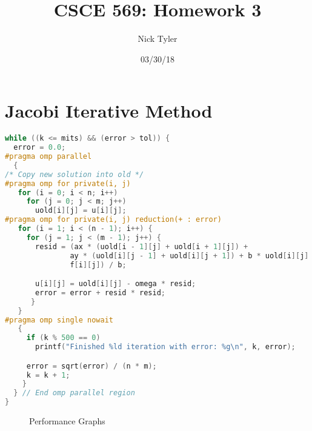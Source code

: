 \documentclass[a4paper]{article}
\title{CSCE 569: Homework 3}
\author{Nick Tyler}
\date{03/30/18}
\begin{document}
\maketitle

\section*{Jacobi Iterative Method}


\begin{lstlisting}[language=C++]
while ((k <= mits) && (error > tol)) {
  error = 0.0;
#pragma omp parallel
  {
/* Copy new solution into old */
#pragma omp for private(i, j)
   for (i = 0; i < n; i++)
     for (j = 0; j < m; j++)
       uold[i][j] = u[i][j];
#pragma omp for private(i, j) reduction(+ : error)
   for (i = 1; i < (n - 1); i++) {
     for (j = 1; j < (m - 1); j++) {
       resid = (ax * (uold[i - 1][j] + uold[i + 1][j]) +
               ay * (uold[i][j - 1] + uold[i][j + 1]) + b * uold[i][j] -
               f[i][j]) / b;

       u[i][j] = uold[i][j] - omega * resid;
       error = error + resid * resid;
      }
   }
#pragma omp single nowait
   {
     if (k % 500 == 0)
       printf("Finished %ld iteration with error: %g\n", k, error);

     error = sqrt(error) / (n * m);
     k = k + 1;
    }
  } // End omp parallel region
}
\end{lstlisting}

\pagebreak
\begin{figure}[h]
\vfill
\caption{Performance Graphs}
\end{figure}
\end{document}
